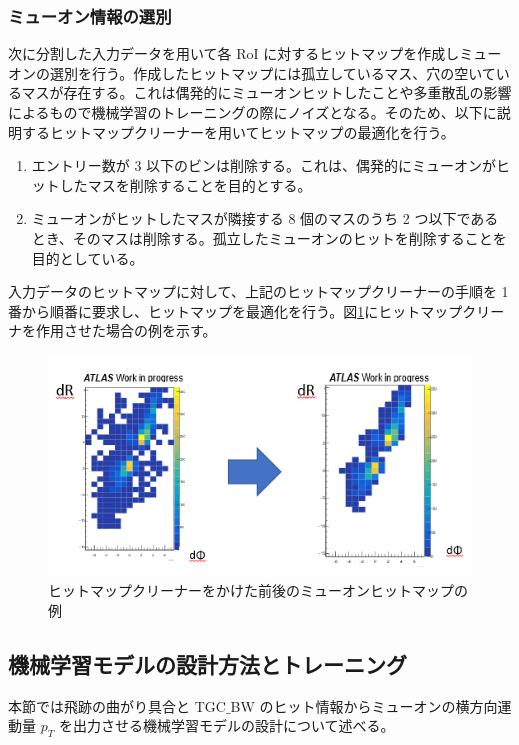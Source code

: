 \subsubsection{ミューオン情報の選別}
次に分割した入力データを用いて各 RoI に対するヒットマップを作成しミューオンの選別を行う。作成したヒットマップには孤立しているマス、穴の空いているマスが存在する。これは偶発的にミューオンヒットしたことや多重散乱の影響によるもので機械学習のトレーニングの際にノイズとなる。そのため、以下に説明するヒットマップクリーナーを用いてヒットマップの最適化を行う。
\begin{enumerate}
   \item エントリー数が 3 以下のビンは削除する。これは、偶発的にミューオンがヒットしたマスを削除することを目的とする。
   \item ミューオンがヒットしたマスが隣接する 8 個のマスのうち 2 つ以下であるとき、そのマスは削除する。孤立したミューオンのヒットを削除することを目的としている。
\end{enumerate}
入力データのヒットマップに対して、上記のヒットマップクリーナーの手順を 1 番から順番に要求し、ヒットマップを最適化を行う。図\ref{fig:hitmapcleaner}にヒットマップクリーナを作用させた場合の例を示す。

\begin{figure}[tb]
  \centering
  \includegraphics[clip, width=14cm]{fig/4/cleaner.png}
  \caption{ヒットマップクリーナーをかけた前後のミューオンヒットマップの例}
  \label{fig:hitmapcleaner}
\end{figure}


\subsection{機械学習モデルの設計方法とトレーニング}
本節では飛跡の曲がり具合と TGC$\_$BW のヒット情報からミューオンの横方向運動量 $p_T$ を出力させる機械学習モデルの設計について述べる。

